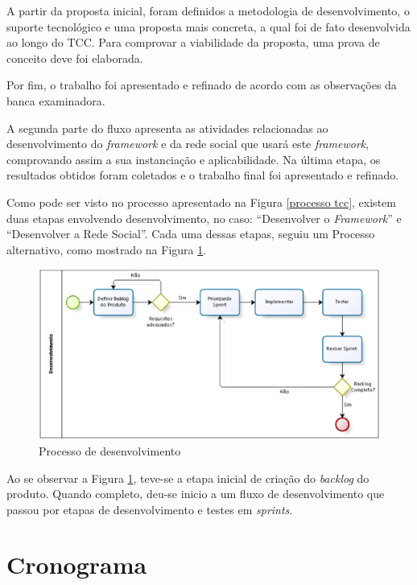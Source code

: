 A partir da proposta inicial, foram definidos a metodologia de desenvolvimento, o suporte tecnológico e uma proposta mais concreta, a qual foi de fato desenvolvida ao longo do TCC. Para comprovar a viabilidade da proposta, uma prova de conceito deve foi elaborada.

Por fim, o trabalho foi apresentado e refinado de acordo com as observações da banca examinadora.

A segunda parte do fluxo apresenta as atividades relacionadas ao desenvolvimento do \textit{framework} e da rede social que usará este \textit{framework}, comprovando assim a sua instanciação e aplicabilidade. Na última etapa, os resultados obtidos foram coletados e o trabalho final foi apresentado e refinado.

Como pode ser visto no processo apresentado na Figura \ref{processo tcc}, existem duas etapas  envolvendo desenvolvimento, no caso: ``Desenvolver o \textit{Framework}'' e ``Desenvolver a Rede Social''. Cada uma dessas etapas, seguiu um Processo alternativo, como mostrado na Figura \ref{Processo desenvolvimento}.

\begin{figure}[h]
	\centering
	\includegraphics[scale=0.4]{figuras/capitulo4/processo_desenvolvimento.eps}
	\caption{Processo de desenvolvimento}
	\label{Processo desenvolvimento}
\end{figure}

Ao se observar a Figura \ref{Processo desenvolvimento}, teve-se a etapa inicial de criação do \textit{backlog} do produto. Quando completo, deu-se inicio a um fluxo de desenvolvimento que passou por etapas de desenvolvimento e testes em \textit{sprints}.

\section{Cronograma}

